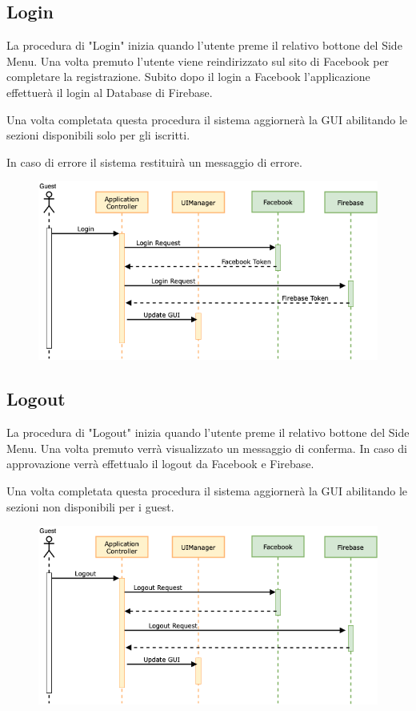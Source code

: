 \documentclass[numbers=noenddot, 12pt, a4paper, oneside]{scrbook}
\begin{document}
\subsection*{Login}
La procedura di "Login" inizia quando l'utente preme il relativo bottone del Side Menu. Una volta premuto l'utente viene reindirizzato sul sito di Facebook per completare la registrazione. Subito dopo il login a Facebook l'applicazione effettuerà il login al Database di Firebase.

Una volta completata questa procedura il sistema aggiornerà la GUI abilitando le sezioni disponibili solo per gli iscritti.

In caso di errore il sistema restituirà un messaggio di errore.
\begin{figure}[H]
	\centering
	\includegraphics[width=1\textwidth]{images/Sequence/Login}
\end{figure}
\newpage

\subsection*{Logout}
La procedura di "Logout" inizia quando l'utente preme il relativo bottone del Side Menu. Una volta premuto verrà visualizzato un messaggio di conferma. In caso di approvazione verrà effettualo il logout da Facebook e Firebase.

Una volta completata questa procedura il sistema aggiornerà la GUI abilitando le sezioni non disponibili per i guest.

\begin{figure}[H]
	\centering
	\includegraphics[width=1\textwidth]{images/Sequence/Logout}
\end{figure}
\newpage
\end{document}
